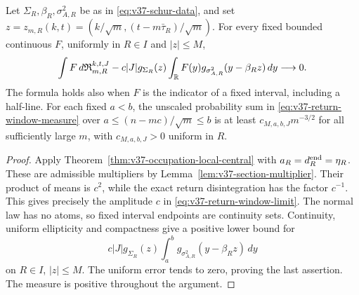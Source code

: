 \begin{theorem}
\label{thm:v37-return-window}
Let $\Sigma_R,\beta_R,\sigma_{A,R}^2$ be as in
\eqref{eq:v37-schur-data}, and set
$z=z_{m,R}(k,t)=(k/\sqrt m,(t-m\bar\tau_R)/\sqrt m)$.
For every fixed bounded continuous $F$, uniformly in $R\in I$ and
$|z|\le M$,
\begin{equation}\label{eq:v37-return-window-limit}
 \int F\,d\mathfrak R_{m,R}^{k,t,J}
  -c|J|g_{\Sigma_R}(z)
       \int_\R F(y)g_{\sigma_{A,R}^2}(y-\beta_Rz)\,dy
                       \longrightarrow0.
\end{equation}
The formula holds also when $F$ is the indicator of a fixed interval,
including a half-line. For each fixed $a<b$, the unscaled probability
sum in \eqref{eq:v37-return-window-measure} over
$a\le(n-mc)/\sqrt m\le b$ is at least $c_{M,a,b,J}m^{-3/2}$ for
all sufficiently large $m$, with $c_{M,a,b,J}>0$ uniform in $R$.
\end{theorem}
\begin{proof}
Apply Theorem~\ref{thm:v37-occupation-local-central} with
$a_R=d_R^{\rm end}=\eta_R$. These are admissible multipliers by
Lemma~\ref{lem:v37-section-multiplier}. Their product of means is
$c^2$, while the exact return disintegration has the factor $c^{-1}$.
This gives precisely the amplitude $c$ in
\eqref{eq:v37-return-window-limit}.
The normal law has no atoms, so fixed interval endpoints are continuity
sets. Continuity, uniform ellipticity and compactness give a positive
lower bound for
\[
 c|J|g_{\Sigma_R}(z)
       \int_a^b g_{\sigma_{A,R}^2}(y-\beta_Rz)\,dy
\]
on $R\in I$, $|z|\le M$. The uniform error tends to zero, proving the
last assertion. The measure is positive throughout the argument.
\end{proof}

